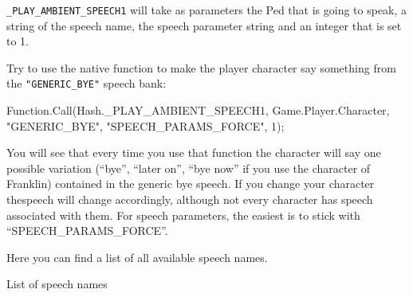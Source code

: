 \documentclass[
  openany]{book}
\newenvironment{Shaded}{\begin{snugshade}}{\end{snugshade}}
\newcommand{\DecValTok}[1]{\textcolor[rgb]{0.00,0.00,0.81}{#1}}
\newcommand{\FunctionTok}[1]{\textcolor[rgb]{0.00,0.00,0.00}{#1}}
\newcommand{\NormalTok}[1]{#1}
\newcommand{\StringTok}[1]{\textcolor[rgb]{0.31,0.60,0.02}{#1}}
\begin{document}
\texttt{\_PLAY\_AMBIENT\_SPEECH1} will take as parameters the Ped that is going to speak, a string of the speech name, the speech parameter string and an integer that is set to 1.

Try to use the native function to make the player character say something from the \texttt{"GENERIC\_BYE"} speech bank:

\begin{Shaded}
\begin{Highlighting}[]
\NormalTok{Function.}\FunctionTok{Call}\NormalTok{(Hash._PLAY_AMBIENT_SPEECH1, Game.}\FunctionTok{Player}\NormalTok{.}\FunctionTok{Character}\NormalTok{, }\StringTok{"GENERIC_BYE"}\NormalTok{, }\StringTok{"SPEECH_PARAMS_FORCE"}\NormalTok{, }\DecValTok{1}\NormalTok{);}
\end{Highlighting}
\end{Shaded}

You will see that every time you use that function the character will say one possible variation (``bye'', ``later on'', ``bye now'' if you use the character of Franklin) contained in the generic bye speech. If you change your character thespeech will change accordingly, although not every character has speech associated with them. For speech parameters, the easiest is to stick with ``SPEECH\_PARAMS\_FORCE''.

Here you can find a list of all available speech names.

List of speech names
\end{document}
